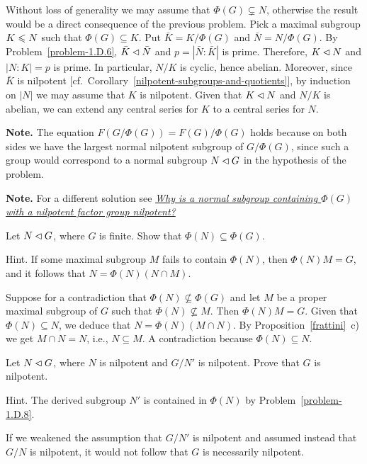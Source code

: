 \begin{solution}
    Without loss of generality we may assume that $\Phi(G)\varsubsetneq N$, otherwise the result would be a direct consequence of the previous problem. Pick a maximal subgroup $K\leqslant N$ such that $\Phi(G)\subseteq K$. Put $\bar K=K/\Phi(G)$ and $\bar N=N/\Phi(G)$. By Problem~\ref{problem-1.D.6}, $\bar K\lhd\bar N$ and $p=|\bar N:\bar K|$ is prime. Therefore, $K\lhd N$ and $|N:K|=p$ is prime. In particular, $N/K$ is cyclic, hence abelian. Moreover, since $\bar K$ is nilpotent [cf.~Corollary~\ref{nilpotent-subgroups-and-quotients}], by induction on $|N|$ we may assume that $K$ is nilpotent. Given that $K \lhd N$ and $N/K$ is abelian, we can extend any central series for $K$ to a central series for $N$.
\end{solution}

\textbf{Note.} The equation $F(G/\Phi(G)) = F(G)/\Phi(G)$ holds because on both sides we have the largest normal nilpotent subgroup of $G/\Phi(G)$, since such a group would correspond to a normal subgroup $N\lhd G$ in the hypothesis of the problem.

\textbf{Note.} For a different solution see \href{https://math.stackexchange.com/a/209225/269050}{\it Why is a normal subgroup containing $\Phi(G)$ with a nilpotent factor group nilpotent?}


\begin{probl}\label{problem-2.D.16}
    Let\/ $N\lhd G$, where\/ $G$ is finite. Show that\/ $\Phi(N) \subseteq \Phi(G)$.

    \textrm{\upshape Hint. If some maximal subgroup $M$ fails to contain $\Phi(N)$, then $\Phi(N)M= G$, and it follows that $N = \Phi(N)(N\cap M)$.}
\end{probl}

\begin{solution} Suppose for a contradiction that $\Phi(N)\not\subseteq\Phi(G)$ and let $M$ be a proper maximal subgroup of $G$ such that $\Phi(N)\not\subseteq M$. Then $\Phi(N)M=G$. Given that $\Phi(N)\subseteq N$, we deduce that $N=\Phi(N)(M\cap N)$. By Proposition~\ref{frattini}~c) we get $M\cap N=N$, i.e., $N\subseteq M$. A contradiction because $\Phi(N)\subseteq N$.  \end{solution}

\begin{probl}
    Let $N\lhd G$, where $N$ is nilpotent and\/ $G/N'$ is nilpotent. Prove that\/ $G$ is nilpotent.
    
    \textrm{\upshape Hint. The derived subgroup $N'$ is contained in $\Phi(N)$ by Problem~\ref{problem-1.D.8}.}

    \textrm{ If we weakened the assumption that $G/N'$ is nilpotent and assumed instead that $G/N$ is nilpotent, it would not follow that $G$ is necessarily nilpotent.}
\end{probl}

